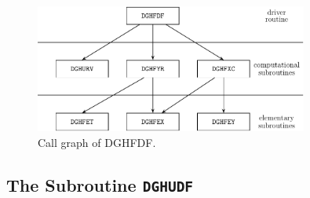 \documentclass[a4paper,10pt]{article}
\begin{document}
%
\begin{figure}[ht]
 \centering
 \includegraphics[width=0.8\textwidth]{real_factored.pdf}
 \caption{Call graph of DGHFDF.}
\end{figure}
%
\subsection{The Subroutine \texttt{DGHUDF}}
%
\end{document}
